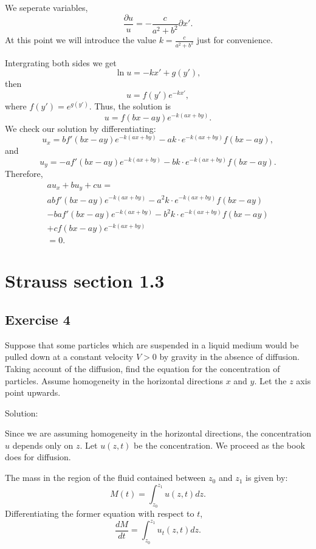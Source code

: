 \documentclass{article}
\begin{document}
		We seperate variables, \[\frac{\partial u}{u}=-\frac{c}{a^2+b^2}\partial x'.\]
		At this point we will introduce the value $k=\frac{c}{a^2+b^2}$ just for convenience.

		Intergrating both sides we get
		\[
			\ln u = -kx' +g(y'),
		\]
		then
		\[
		u = f(y')e^{-kx'},
		\]
		where $f(y')=e^{g(y')}$.
		Thus, the solution is
		\[
		u = f(bx-ay)e^{-k(ax+by)}.
		\]
		We check our solution by differentiating:
		\[
		u_x= b f'(bx-ay)e^{-k(ax+by)} -ak \cdot e^{-k(ax+by)}f(bx-ay),
		\]
		and
		\[
		u_y= -a f'(bx-ay)e^{-k(ax+by)} -bk \cdot e^{-k(ax+by)}f(bx-ay).
		\]	
		Therefore,
			\begin{multline*}
				au_x+bu_y+cu= \\
				ab f'(bx-ay)e^{-k(ax+by)} -a^2k \cdot e^{-k(ax+by)}f(bx-ay)\\
				-ba f'(bx-ay)e^{-k(ax+by)}-b^2k \cdot e^{-k(ax+by)}f(bx-ay) \\
				+cf(bx-ay)e^{-k(ax+by)} \\
				=0.
			\end{multline*}

\section{Strauss section 1.3}
\subsection{Exercise 4}
		Suppose that some particles which are
			suspended in a liquid medium would be pulled down
			at a constant velocity $V > 0$ by gravity in the
			absence of diffusion. Taking account of the
			diffusion, find the equation for the concentration
			of particles. Assume homogeneity in the horizontal
			directions $x$ and $y$. Let the $z$ axis point upwards.

			Solution:

			Since we are assuming homogeneity in the horizontal
			directions, the concentration $u$ depends only on $z$.
			Let $u(z,t)$ be the concentration. We proceed as the
			book does for diffusion.

			The mass in the region of the fluid contained between
			$z_0$ and $z_1$ is given by:
            \begin{equation*}
				M(t) = \int_{z_0}^{z_1} u(z,t)dz.
			\end{equation*}
			Differentiating the former equation with respect to $t$,
			\begin{equation}\label{change_of_mass}
				\frac{dM}{dt}=\int_{z_0}^{z_1}u_t(z,t)dz.
			\end{equation}
\end{document}
